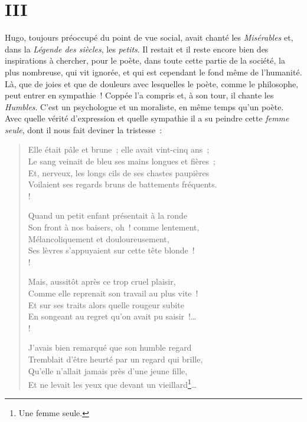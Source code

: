 \documentclass[french,twoside]{book} %
\begin{document}
\section[{III}]{III}
\noindent Hugo, toujours préoccupé du point de vue social, avait chanté les \emph{Misérables} et, dans la \emph{Légende des siècles}, les \emph{petits}. Il restait et il reste encore bien des inspirations à chercher, pour le poète, dans toute cette partie de la société, la plus nombreuse, qui vit ignorée, et qui est cependant le fond même de l’humanité. Là, que de joies et que de douleurs avec lesquelles le poète, comme le philosophe, peut entrer en sympathie ! Coppée l’a compris et, à son tour, il chante les \emph{Humbles}. C’est un psychologue et un moraliste, en même temps qu’un poète. Avec quelle vérité d’expression et quelle sympathie il a su peindre cette \emph{femme seule}, dont il nous fait deviner la tristesse :\par


\begin{verse}
Elle était pâle et brune ; elle avait vint-cinq ans ;\\
Le sang veinait de bleu ses mains longues et fières ;\\
Et, nerveux, les longs cils de ses chastes paupières\\
Voilaient ses regards bruns de battements fréquents.\\!

Quand un petit enfant présentait à la ronde\\
Son front à nos baisers, oh ! comme lentement,\\
Mélancoliquement et douloureusement,\\
Ses lèvres s’appuyaient sur cette tête blonde !\\!

Mais, aussitôt après ce trop cruel plaisir,\\
Comme elle reprenait son travail au plus vite !\\
Et sur ses traits alors quelle rougeur subite\\
En songeant au regret qu’on avait pu saisir !…\\!

J’avais bien remarqué que son humble regard\\
Tremblait d’être heurté par un regard qui brille,\\
Qu’elle n’allait jamais près d’une jeune fille,\\
Et ne levait les yeux que devant un vieillard\footnote{Une femme seule.}…\\
\end{verse}
\end{document}
